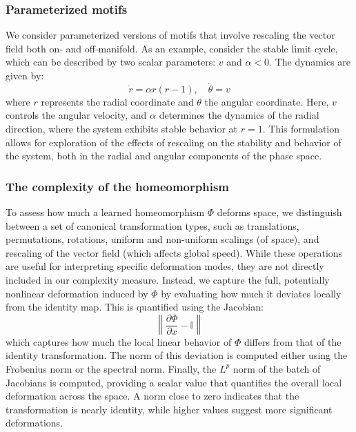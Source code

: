 \documentclass{article}
\theoremstyle{definition} \newtheorem{definition}{Definition}  \newtheorem{example}{Example}
\theoremstyle{remark} \newtheorem{remark}{Remark}
\newcounter{ct}
\begin{document}
\subsubsection{Parameterized motifs}
We consider parameterized versions of motifs that involve rescaling the vector field both on- and off-manifold.
As an example, consider the stable limit cycle, which can be described by two scalar parameters: \( v \) and \( \alpha < 0 \).
The dynamics are given by:
\begin{equation}
\dot{r} = \alpha r (r - 1), %
\quad \dot{\theta} = v
\end{equation}
where \( r \) represents the radial coordinate and \( \theta \) the angular coordinate. Here, \( v \) controls the angular velocity, and \( \alpha \) determines the dynamics of the radial direction, where the system exhibits stable behavior at \( r = 1 \). This formulation allows for exploration of the effects of rescaling on the stability and behavior of the system, both in the radial and angular components of the phase space.



\subsubsection{The complexity of the homeomorphism}
To assess how much a learned homeomorphism $\Phi$ deforms space, we distinguish between a set of canonical transformation types, such as translations, permutations, rotations, uniform and non-uniform scalings (of space), and rescaling of the vector field (which affects global speed).
 While these operations are useful for interpreting specific deformation modes, they are not directly included in our complexity measure.
Instead, we capture the full, potentially nonlinear deformation induced by $\Phi$ by evaluating how much it deviates locally from the identity map. This is quantified using the Jacobian:
\begin{equation}
\left\|\frac{\partial \Phi}{\partial x} - \mathbb{I}\right\|
\end{equation}
which captures how much the local linear behavior of $\Phi$ differs from that of the identity transformation.
The norm of this deviation is computed either using the Frobenius norm or the spectral norm.
Finally, the \( L^p \) norm of the batch of Jacobians is computed, providing a scalar value that quantifies the overall local deformation across the space. A norm close to zero indicates that the transformation is nearly identity, while higher values suggest more significant deformations.
\end{document}

